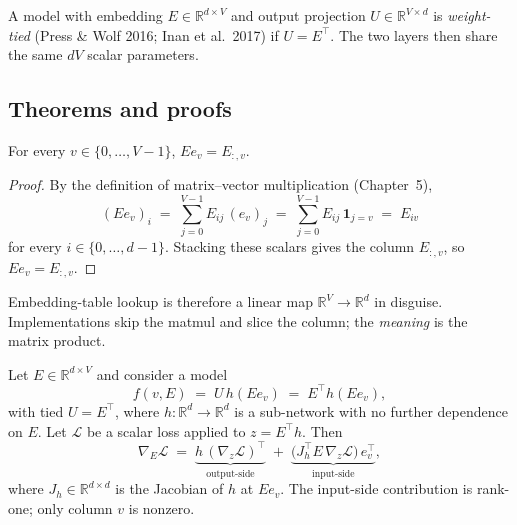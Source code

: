 \begin{definition}
A model with embedding $E\in\mathbb{R}^{d\times V}$ and output projection $U\in\mathbb{R}^{V\times d}$ is \emph{weight-tied} (Press \& Wolf 2016; Inan et al.\ 2017) if $U=E^\top$. The two layers then share the same $dV$ scalar parameters.
\end{definition}

\subsection*{Theorems and proofs}

\begin{theorem}\label{thm:lookup}
For every $v\in\{0,\dots,V-1\}$, $E e_v = E_{:,v}$.
\end{theorem}

\begin{proof}
By the definition of matrix--vector multiplication (Chapter~5),
\[
(E e_v)_i \;=\; \sum_{j=0}^{V-1} E_{ij}\,(e_v)_j \;=\; \sum_{j=0}^{V-1} E_{ij}\,\mathbf{1}_{j=v} \;=\; E_{iv}
\]
for every $i\in\{0,\dots,d-1\}$. Stacking these scalars gives the column $E_{:,v}$, so $Ee_v=E_{:,v}$.
\end{proof}

\begin{remark}
Embedding-table lookup is therefore a linear map $\mathbb{R}^V\to\mathbb{R}^d$ in disguise. Implementations skip the matmul and slice the column; the \emph{meaning} is the matrix product.
\end{remark}

\begin{theorem}\label{thm:tied}
Let $E\in\mathbb{R}^{d\times V}$ and consider a model
\[
f(v,E) \;=\; U\,h(E e_v) \;=\; E^\top h(E e_v),
\]
with tied $U=E^\top$, where $h\colon\mathbb{R}^d\to\mathbb{R}^d$ is a sub-network with no further dependence on $E$. Let $\mathcal{L}$ be a scalar loss applied to $z=E^\top h$. Then
\[
\nabla_E\mathcal{L} \;=\; \underbrace{h\,(\nabla_z\mathcal{L})^\top}_{\text{output-side}} \;+\; \underbrace{\big(J_h^\top E\,\nabla_z\mathcal{L}\big)\,e_v^\top}_{\text{input-side}},
\]
where $J_h\in\mathbb{R}^{d\times d}$ is the Jacobian of $h$ at $E e_v$. The input-side contribution is rank-one; only column $v$ is nonzero.
\end{theorem}

